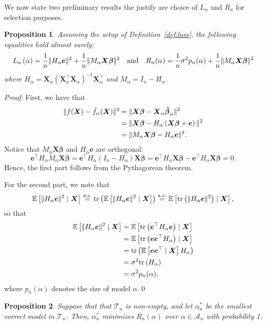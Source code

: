 \documentclass[11pt, letter paper]{article}
\newcommand{\1}{\mathmybb{1}}
\newtheorem{proposition}{Proposition}[section]
\newcommand{\0}{\emptyset}
\newcommand{\Ep}[1]{\mathbb{E}\left[ #1 \right]}
\newcommand{\paren}[1]{\left(#1 \right)}
\newcommand{\norm}[1]{|\hspace{-1pt}|#1 |\hspace{-1pt}|}
\newcommand{\normsq}[1]{\norm{#1}^{2}}
\newcommand{\Acal}{\mathcal{A}_{n}}
\newcommand{\Tcal}{\mathcal{T}_{n}}
\newcommand{\aseq}{\stackrel{\mathrm{a.s.}}{=}}
\newcommand{\X}{\boldsymbol{X}}
\newcommand{\e}{\boldsymbol{e}}
\newcommand{\bbeta}{\boldsymbol{\beta}}
\newcommand{\bbetahat}{\boldsymbol{\hat{\beta}}}
\newcommand{\Loss}[1]{L_{n}\paren{#1}}
\newcommand{\tr}[1]{\mathrm{tr}\paren{#1}}
\begin{document}
We now state two preliminary results the justify are choice of \(L_{n}\) and \(R_{n}\) for selection purposes. 

\begin{proposition}\label{prop:lossshao}
    Assuming the setup of Definition~\ref{def:loss}, the following equalities hold almost surely:
    \[\Loss{\alpha} = \frac{1}{n}\normsq{H_{\alpha}\e} + \frac{1}{n}\normsq{M_{\alpha}\X\bbeta}\quad\text{and}\quad R_{n}(\alpha) = \frac{1}{n}\sigma^{2}p_{n}(\alpha) + \frac{1}{n}\normsq{M_{\alpha}\X\bbeta}\]
    where \(H_{\alpha} = \X_{\alpha}\paren{\X_{\alpha}^{\top}\X_{\alpha}}^{-1}\X_{\alpha}^{\top}\) and \(M_{\alpha}= I_{n} - H_{\alpha}\).
\end{proposition}

\begin{myproofbox}
    \textit{Proof: }
    First, we have that
    \begin{align*}
        \normsq{f(\X) - \hat{f}_{\alpha}(\X)} &= \normsq{\X\bbeta - \X_{\alpha}\bbetahat_{\alpha}}\\
        &= \normsq{\X\bbeta - H_{\alpha}\paren{\X\bbeta + \e}}\\
        &= \normsq{M_{\alpha}\X\bbeta - H_{\alpha}\e}.
    \end{align*}
    Notice that \(M_{\alpha}\X\bbeta\) and \(H_{\alpha}\e\) are orthogonal:
    \[\e^{\top}H_{\alpha}M_{\alpha}\X\bbeta  = \e^{\top}H_{\alpha}\paren{I_{n} - H_{\alpha}}\X\bbeta = \e^{\top}H_{\alpha}\X\bbeta - \e^{\top}H_{\alpha}\X\bbeta = 0.\]
    Hence, the first part follows from the Pythagorean theorem.

    For the second part, we note that \[\Ep{\normsq{H_{\alpha}\e}\mid\X} \aseq \tr{\Ep{\normsq{H_{\alpha}\e}\mid\X}} \aseq \Ep{\tr{\normsq{H_{\alpha}\e}}\mid\X},\]
    so that
    \begin{align*}
        \Ep{\normsq{H_{\alpha}\e}\mid\X} &= \Ep{\tr{\e^{\top}H_{\alpha}\e}\mid\X}\\
        &= \Ep{\tr{\e\e^{\top}H_{\alpha}}\mid\X}\\
        &= \tr{\Ep{\e\e^{\top}\mid\X}H_{\alpha}}\\
        &= \sigma^2\tr{H_{\alpha}}\\
        &= \sigma^{2}p_{n}(\alpha),
    \end{align*}
    where \(p_{n}(\alpha)\) denotes the size of model \(\alpha\).\qed{}
\end{myproofbox}

\begin{proposition}\label{prop:Ropt}
    Suppose that that \(\Tcal\) is non-empty, and let \(\alpha^{*}_{n}\) be the smallest correct model in \(\Tcal\). Then, \(\alpha^{*}_{n}\) minimizes \(R_{n}(\alpha)\) over \(\alpha\in\Acal\) with probability 1.
\end{proposition}
\end{document}
